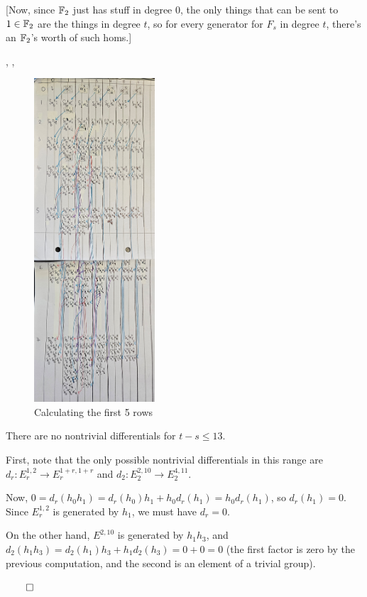 \documentclass{MetricNotes2023}
\def\bb{\ensuremath\mathbb}
\def\done{\begin{flushright}\vspace{-4.35ex}\(\qed\)\end{flushright}}
\begin{document}
[Now, since \(\bb{F}_2\) just has stuff in degree 0, the only things that can be sent to \(1 \in \bb{F}_2\) are the things in degree \(t\), so for every generator for \(F_s\) in degree \(t\), there's an \(\bb{F}_2\)'s worth of such homs.]

\autocite{ass}, \autocite{hatcher5}, \autocite{rognes2}

\begin{figure}[H]\label{2504041920}
\centering
\includegraphics[width=0.4\textwidth]{ext3}
\caption{Calculating the first 5 rows}
\end{figure}

\begin{lemma}
There are no nontrivial differentials for \(t-s\leq 13\). 
\end{lemma}

\begin{ourproof}
First, note that the only possible nontrivial differentials in this range are \(d_r : E_r^{1,2} \to E_r^{1+r, 1+r}\) and \(d_2 : E_2^{2, 10} \to E_2^{4, 11}\). 

Now, \(0=d_r(h_0h_1)=d_r(h_0)h_1 + h_0d_r(h_1)=h_0d_r(h_1)\), so \(d_r(h_1)=0\). Since \(E_r^{1, 2}\) is generated by \(h_1\), we must have \(d_r=0\). 

On the other hand, \(E^{2, 10}\) is generated by \(h_1h_3\), and \(d_2(h_1h_3)=d_2(h_1)h_3+h_1d_2(h_3)=0+0=0\) (the first factor is zero by the previous computation, and the second is an element of a trivial group). \done
\end{ourproof}
\end{document}
